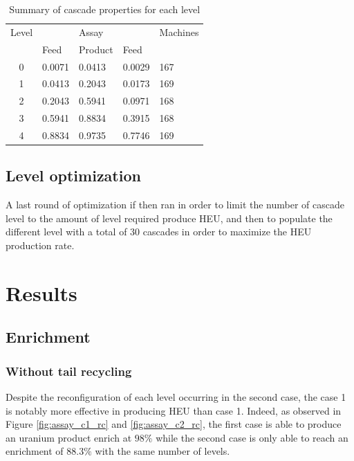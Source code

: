 \documentclass{anstrans}
\begin{document}

\begin{table}[htb]
\centering
\begin{tabular}{cllll}
\toprule

Level   &           & Assay     &       & Machines  \\
        & Feed      & Product   & Feed  &           \\
\midrule
0       & 0.0071    & 0.0413    & 0.0029 & 167       \\
1       & 0.0413    & 0.2043    & 0.0173 & 169       \\
2       & 0.2043    & 0.5941    & 0.0971 & 168       \\
3       & 0.5941    & 0.8834    & 0.3915 & 168       \\
4       & 0.8834    & 0.9735    & 0.7746 & 169       \\

\bottomrule
\end{tabular}
  \caption{Summary of cascade properties for each level}
  \label{tab:cascadelvl}
\end{table}


\subsection{Level optimization}
A last round of optimization if then ran in order to limit the number of cascade
level to the amount of level required produce HEU, and then to populate the
different level with a total of 30 cascades in order to maximize the HEU
production rate.

\section{Results}
\subsection{Enrichment}
\subsubsection{Without tail recycling}
Despite the reconfiguration of each level occurring in the second case, the case
1 is notably more effective in producing HEU than case 1. Indeed, as observed in Figure
\ref{fig:assay_c1_rc} and \ref{fig:assay_c2_rc}, the first case is able to
produce an uranium product enrich at $98\%$ while the second case is only able
to reach an enrichment of $88.3\%$ with the same number of levels.
\end{document}
